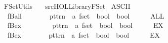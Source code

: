 %
\begin{isabellebody}%
%
%
\isadelimtheory
%
\endisadelimtheory
%
\isatagtheory
{}\isamarkupfalse%
\ FSet{\isacharunderscore}Utils\isanewline
\ \ \ {\isachardoublequoteopen}{\isachartilde}{\isachartilde}{\isacharslash}src{\isacharslash}HOL{\isacharslash}Library{\isacharslash}FSet{\isachardoublequoteclose}\isanewline
{}%
\endisatagtheory
{\isafoldtheory}%
%
\isadelimtheory
\isanewline
%
\endisadelimtheory
\isanewline
{}\isamarkupfalse%
\ {\isacharparenleft}ASCII{\isacharparenright}\isanewline
\ \ {\isachardoublequoteopen}{\isacharunderscore}fBall{\isachardoublequoteclose}\ \ \ \ \ \ \ {\isacharcolon}{\isacharcolon}\ {\isachardoublequoteopen}pttrn\ {\isasymRightarrow}\ {\isacharprime}a\ fset\ {\isasymRightarrow}\ bool\ {\isasymRightarrow}\ bool{\isachardoublequoteclose}\ \ \ \ \ \ {\isacharparenleft}{\isachardoublequoteopen}{\isacharparenleft}{}ALL\ {\isacharparenleft}{\isacharunderscore}{\isacharslash}{\isacharcolon}{\isacharunderscore}{\isacharparenright}{\isachardot}{\isacharslash}\ {\isacharunderscore}{\isacharparenright}{\isachardoublequoteclose}\ {\isacharbrackleft}{}{\isacharcomma}\ {}{\isacharcomma}\ {}{}{\isacharbrackright}\ {}{}{\isacharparenright}\isanewline
\ \ {\isachardoublequoteopen}{\isacharunderscore}fBex{\isachardoublequoteclose}\ \ \ \ \ \ \ \ {\isacharcolon}{\isacharcolon}\ {\isachardoublequoteopen}pttrn\ {\isasymRightarrow}\ {\isacharprime}a\ fset\ {\isasymRightarrow}\ bool\ {\isasymRightarrow}\ bool{\isachardoublequoteclose}\ \ \ \ \ \ {\isacharparenleft}{\isachardoublequoteopen}{\isacharparenleft}{}EX\ {\isacharparenleft}{\isacharunderscore}{\isacharslash}{\isacharcolon}{\isacharunderscore}{\isacharparenright}{\isachardot}{\isacharslash}\ {\isacharunderscore}{\isacharparenright}{\isachardoublequoteclose}\ {\isacharbrackleft}{}{\isacharcomma}\ {}{\isacharcomma}\ {}{}{\isacharbrackright}\ {}{}{\isacharparenright}\isanewline
\ \ {\isachardoublequoteopen}{\isacharunderscore}fBex{}{\isachardoublequoteclose}\ \ \ \ \ \ \ {\isacharcolon}{\isacharcolon}\ {\isachardoublequoteopen}pttrn\ {\isasymRightarrow}\ {\isacharprime}a\ fset\ {\isasymRightarrow}\ bool\ {\isasymRightarrow}\ bool{\isachardoublequoteclose}\ \ \ \ \ \ {\isacharparenleft}{\isachardoublequoteopen}{\isacharparenleft}{}EX{\isacharbang}\ {\isacharparenleft}{\isacharunderscore}{\isacharslash}{\isacharcolon}{\isacharunderscore}{\isacharparenright}{\isachardot}{\isacharslash}\ {\isacharunderscore}{\isacharparenright}{\isachardoublequoteclose}\ {\isacharbrackleft}{}{\isacharcomma}\ {}{\isacharcomma}\ {}{}{\isacharbrackright}\ {}{}{\isacharparenright}\isanewline

\end{isabellebody}
